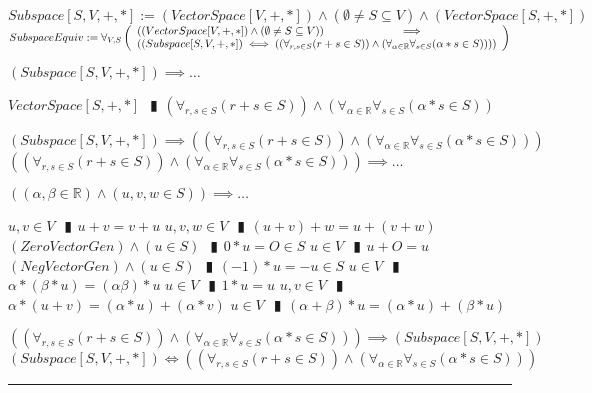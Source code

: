 \documentclass{book}
\newcommand{\abr}{:=}
\newcommand{\pipe}{$\phantom{(}\vrectangleblack\phantom{)}$}
\begin{document}
$Subspace[S, V, +, *] \abr (VectorSpace[V, +, *]) \land (\emptyset \neq S \subseteq V) \land (VectorSpace[S, +, *])$ \\

$SubspaceEquiv \abr \forall_{V, S}\left(\begin{array}{ll}
  ((VectorSpace[V, +, *]) \land (\emptyset \neq S \subseteq V)) \hfill \implies \hfill \\
  ((Subspace[S, V, +, *]) \iff ((\forall_{r, s \in S}(r + s \in S)) \land (\forall_{\alpha \in \mathbb{R}} \forall_{s \in S}(\alpha * s \in S))))
\end{array}\right)$
\begin{enumerate}
  \lit $(Subspace[S, V, +, *]) \implies \ldots$
  \begin{enumerate}
    \lit $VectorSpace[S, +, *]$ \pipe $(\forall_{r, s \in S}(r + s \in S)) \land (\forall_{\alpha \in \mathbb{R}} \forall_{s \in S}(\alpha * s \in S))$
  \end{enumerate}
  \lit $(Subspace[S, V, +, *]) \implies ((\forall_{r, s \in S}(r + s \in S)) \land (\forall_{\alpha \in \mathbb{R}} \forall_{s \in S}(\alpha * s \in S)))$
  \lit $((\forall_{r, s \in S}(r + s \in S)) \land (\forall_{\alpha \in \mathbb{R}} \forall_{s \in S}(\alpha * s \in S))) \implies \ldots$
  \begin{enumerate}
    \lit $((\alpha ,\beta \in \mathbb{R}) \land (u, v, w \in S)) \implies \ldots$
    \begin{enumerate}
      \lit $u, v \in V$ \pipe $u + v = v + u$
      \lit $u, v, w \in V$ \pipe $(u + v) + w = u + (v + w)$
      \lit $(ZeroVectorGen) \land (u \in S)$ \pipe $0 * u = O \in S$
      \lit $u \in V$ \pipe $u + O = u$
      \lit $(NegVectorGen) \land (u \in S)$ \pipe $(-1) * u = -u \in S$
      \lit $u \in V$ \pipe $\alpha * (\beta * u) = (\alpha \beta) * u$
      \lit $u \in V$ \pipe $1 * u = u$
      \lit $u, v \in V$ \pipe $\alpha * (u + v) = (\alpha * u) + (\alpha * v)$
      \lit $u \in V$ \pipe $(\alpha + \beta) * u = (\alpha * u) + (\beta * u)$
    \end{enumerate}
  \end{enumerate}
  \lit $((\forall_{r, s \in S}(r + s \in S)) \land (\forall_{\alpha \in \mathbb{R}} \forall_{s \in S}(\alpha * s \in S))) \implies (Subspace[S, V, +, *])$
  \lit $(Subspace[S, V, +, *]) \iff ((\forall_{r, s \in S}(r + s \in S)) \land (\forall_{\alpha \in \mathbb{R}} \forall_{s \in S}(\alpha * s \in S)))$
\end{enumerate} \vspace{.75mm} \hrule \vspace{.75mm} \ \\ 
\end{document}
